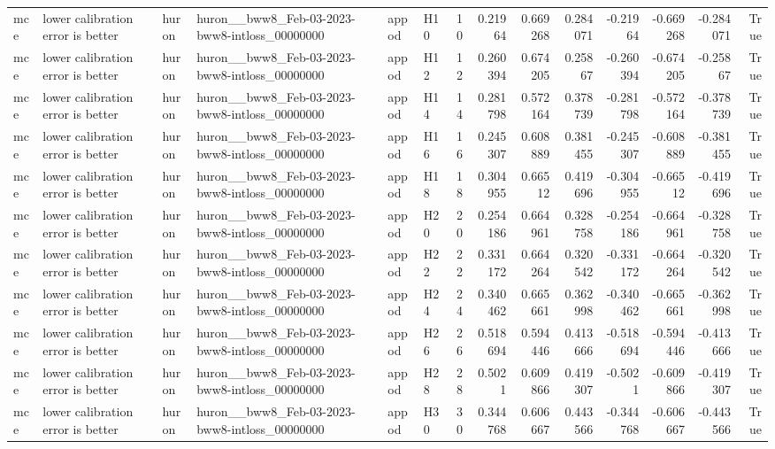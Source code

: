 \begin{longtable}{llllllrrrrrrrr}
mce & lower calibration error is better & huron & huron\_\_bww8\_Feb-03-2023-bww8-intloss\_00000000 & appod & H10 & 10 & 0.21964 & 0.669268 & 0.284071 & -0.21964 & -0.669268 & -0.284071 & True \\
mce & lower calibration error is better & huron & huron\_\_bww8\_Feb-03-2023-bww8-intloss\_00000000 & appod & H12 & 12 & 0.260394 & 0.674205 & 0.25867 & -0.260394 & -0.674205 & -0.25867 & True \\
mce & lower calibration error is better & huron & huron\_\_bww8\_Feb-03-2023-bww8-intloss\_00000000 & appod & H14 & 14 & 0.281798 & 0.572164 & 0.378739 & -0.281798 & -0.572164 & -0.378739 & True \\
mce & lower calibration error is better & huron & huron\_\_bww8\_Feb-03-2023-bww8-intloss\_00000000 & appod & H16 & 16 & 0.245307 & 0.608889 & 0.381455 & -0.245307 & -0.608889 & -0.381455 & True \\
mce & lower calibration error is better & huron & huron\_\_bww8\_Feb-03-2023-bww8-intloss\_00000000 & appod & H18 & 18 & 0.304955 & 0.66512 & 0.419696 & -0.304955 & -0.66512 & -0.419696 & True \\
mce & lower calibration error is better & huron & huron\_\_bww8\_Feb-03-2023-bww8-intloss\_00000000 & appod & H20 & 20 & 0.254186 & 0.664961 & 0.328758 & -0.254186 & -0.664961 & -0.328758 & True \\
mce & lower calibration error is better & huron & huron\_\_bww8\_Feb-03-2023-bww8-intloss\_00000000 & appod & H22 & 22 & 0.331172 & 0.664264 & 0.320542 & -0.331172 & -0.664264 & -0.320542 & True \\
mce & lower calibration error is better & huron & huron\_\_bww8\_Feb-03-2023-bww8-intloss\_00000000 & appod & H24 & 24 & 0.340462 & 0.665661 & 0.362998 & -0.340462 & -0.665661 & -0.362998 & True \\
mce & lower calibration error is better & huron & huron\_\_bww8\_Feb-03-2023-bww8-intloss\_00000000 & appod & H26 & 26 & 0.518694 & 0.594446 & 0.413666 & -0.518694 & -0.594446 & -0.413666 & True \\
mce & lower calibration error is better & huron & huron\_\_bww8\_Feb-03-2023-bww8-intloss\_00000000 & appod & H28 & 28 & 0.5021 & 0.609866 & 0.419307 & -0.5021 & -0.609866 & -0.419307 & True \\
mce & lower calibration error is better & huron & huron\_\_bww8\_Feb-03-2023-bww8-intloss\_00000000 & appod & H30 & 30 & 0.344768 & 0.606667 & 0.443566 & -0.344768 & -0.606667 & -0.443566 & True \\

\end{longtable}
